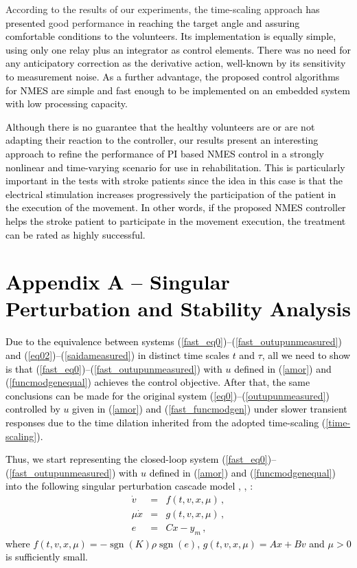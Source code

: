 \documentclass[review]{elsarticle}
\newcommand{\sgn}{\operatorname{sgn}}
\begin{document}
According to the results of our experiments, the time-scaling approach \textcolor{black}{has presented} good performance \textcolor{black}{in reaching the target angle and assuring comfortable conditions to the volunteers.} \textcolor{black}{Its implementation is equally simple, using only one relay plus an integrator as control elements. There was no need for any anticipatory correction as the derivative action, well-known by its sensitivity to measurement noise. As a further advantage, the proposed control algorithms for NMES are simple and fast
\textcolor{black}{enough} to be implemented on an embedded system with low processing capacity.}


\textcolor{black}{Although there is no guarantee that the healthy volunteers are or are not adapting their reaction to the controller, our results present an interesting approach to refine the performance of PI based NMES control in a strongly nonlinear and time-varying scenario for use in rehabilitation. This is particularly important in the tests with stroke patients since the idea in this case is that the electrical stimulation increases progressively the participation of the patient in the execution of the movement. In other words, if the proposed NMES controller helps the stroke patient to participate in the movement execution, the treatment can be rated as highly successful.}





\section*{
\textcolor{black}{Appendix A -- Singular Perturbation and Stability Analysis}} \label{AppendixA}


\textcolor{black}{
Due to the equivalence between systems (\ref{fast_eq0})--(\ref{fast_outupunmeasured}) and (\ref{eq02})--(\ref{saidameasured}) in distinct time scales $t$ and $\tau$, all we need to show is that (\ref{fast_eq0})--(\ref{fast_outupunmeasured}) with $u$ defined in (\ref{amor}) and (\ref{funcmodgenequal}) achieves the control objective. After that, the same conclusions can be made for the original system (\ref{eq0})--(\ref{outupunmeasured}) controlled by $u$ given in (\ref{amor}) and (\ref{fast_funcmodgen}) under slower transient responses due to the time
dilation inherited from the adopted time-scaling (\ref{time-scaling}).
}

\textcolor{black}{
Thus, we start representing the closed-loop system (\ref{fast_eq0})--(\ref{fast_outupunmeasured}) with $u$ defined in (\ref{amor}) and (\ref{funcmodgenequal}) into the following singular perturbation cascade model \cite{K:2002}, \cite{KKO:1986}, \cite{U:92}:
%
\begin{eqnarray} \label{singular_system1}
\dot v &=& f(t,v,x,\mu)\,,\\
\mu \dot x &=& g(t,v,x,\mu)\,, \label{singular_system2}\\
e&=&Cx-y_m\,, \label{singular_system3}
\end{eqnarray}
%
where $f(t,v,x,\mu)=-\sgn(K)\rho\sgn(e)$, $g(t,v,x,\mu)=Ax+Bv$ and $\mu>0$ is sufficiently small.
}
\end{document}
